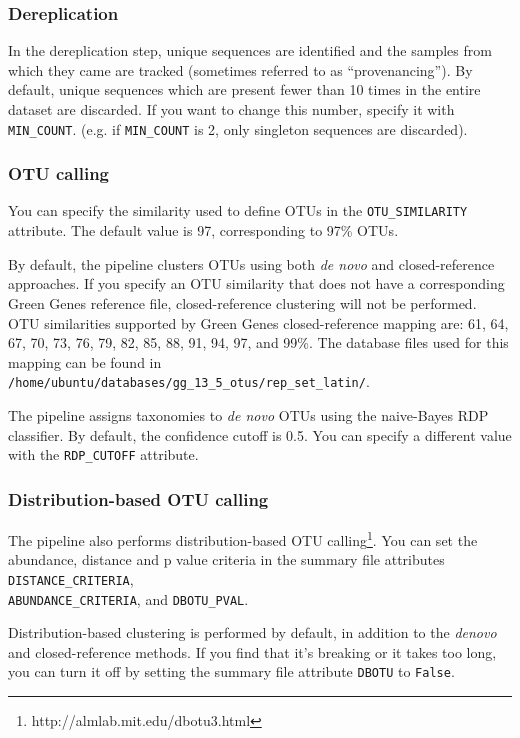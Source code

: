\documentclass[11pt, oneside]{article}   	%
\begin{document}
\subsubsection{Dereplication}

In the dereplication step, unique sequences are identified and the
samples from which they came are tracked (sometimes referred to as 
``provenancing''). By default, unique sequences which are present fewer
than 10 times in the entire dataset are discarded. If you want to change
this number, specify it with \texttt{MIN\_COUNT}.  (e.g. if \texttt{MIN\_COUNT}
is 2, only singleton sequences are discarded).

\subsubsection{OTU calling}

You can specify the similarity used to define OTUs in the \texttt{OTU\_SIMILARITY}
attribute. The default value is 97, corresponding to 97\% OTUs.

By default, the pipeline clusters OTUs using both \textit{de novo} and closed-reference
approaches. If you specify an OTU similarity that does not have a corresponding
Green Genes reference file, closed-reference clustering will not be performed. 
OTU similarities supported by Green Genes closed-reference mapping are: 61, 64, 67, 70, 73, 76, 79, 82, 85, 88, 91, 94, 97, and 99\%. 
The database files used for this mapping can be found in \texttt{/home/ubuntu/databases/gg\_13\_5\_otus/rep\_set\_latin/}.

The pipeline assigns taxonomies to \textit{de novo} OTUs using the naive-Bayes RDP
classifier. By default, the confidence cutoff is 0.5. You can specify a different
value with the \texttt{RDP\_CUTOFF} attribute.

\subsubsection{Distribution-based OTU calling}

The pipeline also performs distribution-based OTU calling\footnote{http://almlab.mit.edu/dbotu3.html}. 
You can set the abundance, distance and p value criteria
in the summary file attributes \texttt{DISTANCE\_CRITERIA}, \\
\texttt{ABUNDANCE\_CRITERIA}, and \texttt{DBOTU\_PVAL}.

Distribution-based clustering is performed by default, in addition
to the \textit{denovo} and closed-reference methods. If you find
that it's breaking or it takes too long, you can turn it off by setting
the summary file attribute \texttt{DBOTU} to \texttt{False}.
\end{document}
